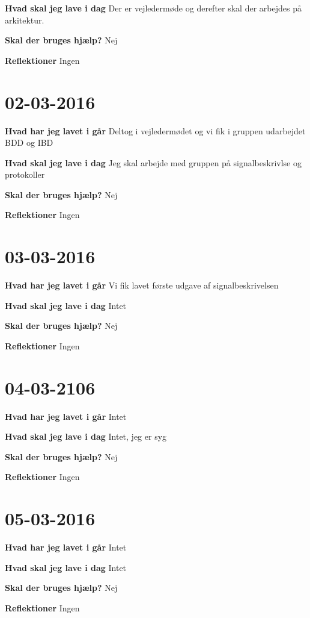 \documentclass{article}
\begin{document}
	\textbf{Hvad skal jeg lave i dag} Der er vejledermøde og derefter skal der arbejdes på arkitektur.
		
	\textbf{Skal der bruges hjælp?} Nej
		
	\textbf{Reflektioner} Ingen
	
	
	\section{02-03-2016}
		
	\textbf{Hvad har jeg lavet i går} Deltog i vejledermødet og vi fik i gruppen udarbejdet BDD og IBD
		
	\textbf{Hvad skal jeg lave i dag} Jeg skal arbejde med gruppen på signalbeskrivlse og protokoller
		
	\textbf{Skal der bruges hjælp?} Nej
		
	\textbf{Reflektioner} Ingen
	
	
	\section{03-03-2016}
		
	\textbf{Hvad har jeg lavet i går} Vi fik lavet første udgave af signalbeskrivelsen
	
	\textbf{Hvad skal jeg lave i dag} Intet
		
	\textbf{Skal der bruges hjælp?} Nej
		
	\textbf{Reflektioner} Ingen
	
	
	\section{04-03-2106}
	
	\textbf{Hvad har jeg lavet i går} Intet
	
	\textbf{Hvad skal jeg lave i dag} Intet, jeg er syg
	
	\textbf{Skal der bruges hjælp?} Nej
	
	\textbf{Reflektioner} Ingen

	\section{05-03-2016}
	
	\textbf{Hvad har jeg lavet i går} Intet
	
	\textbf{Hvad skal jeg lave i dag} Intet
	
	\textbf{Skal der bruges hjælp?} Nej
	
	\textbf{Reflektioner} Ingen
	
\end{document}
